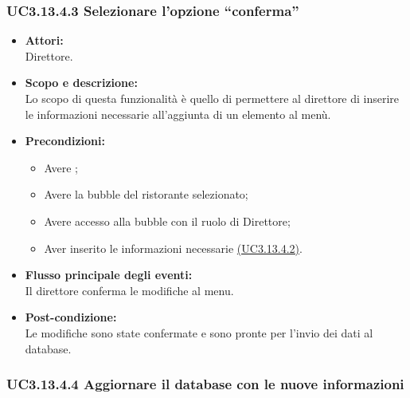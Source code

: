 \subsubsection{UC3.13.4.3 Selezionare l’opzione “conferma”} \label{UC3.13.4.3}

\begin{itemize}
	\item \textbf{Attori:}
	\\Direttore.
	\item \textbf{Scopo e descrizione:} 
	\\Lo scopo di questa funzionalità è quello di permettere al direttore di inserire le informazioni necessarie all’aggiunta di un elemento al menù.
	\item \textbf{Precondizioni:}
	\begin{itemize}
		\item Avere ;
		\item Avere la bubble del ristorante selezionato;
		\item Avere accesso alla bubble con il ruolo di Direttore;
		\item Aver inserito le informazioni necessarie \hyperref[UC3.13.4.2]{(UC3.13.4.2)}.
	\end{itemize}
	\item \textbf{Flusso principale degli eventi:}
	\\Il direttore conferma le modifiche al menu.
	\item \textbf{Post-condizione:}
	\\Le modifiche sono state confermate e sono pronte per l'invio dei dati al database.
\end{itemize}

\subsubsection{UC3.13.4.4 Aggiornare il database con le nuove informazioni} \label{UC3.13.4.4}


